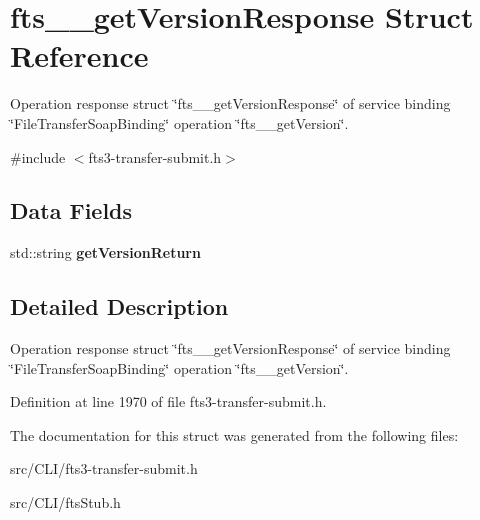 \section{fts\_\-\_\-getVersionResponse Struct Reference}
\label{structfts____getVersionResponse}


Operation response struct \char`\"{}fts\_\-\_\-getVersionResponse\char`\"{} of service binding \char`\"{}FileTransferSoapBinding\char`\"{} operation \char`\"{}fts\_\-\_\-getVersion\char`\"{}.  




{\ttfamily \#include $<$fts3-\/transfer-\/submit.h$>$}

\subsection*{Data Fields}
\begin{DoxyCompactItemize}
\item 
std::string {\bfseries getVersionReturn}\label{structfts____getVersionResponse_aa57e2ffd35d3a996bb2dfeb21d79a2b7}

\end{DoxyCompactItemize}


\subsection{Detailed Description}
Operation response struct \char`\"{}fts\_\-\_\-getVersionResponse\char`\"{} of service binding \char`\"{}FileTransferSoapBinding\char`\"{} operation \char`\"{}fts\_\-\_\-getVersion\char`\"{}. 

Definition at line 1970 of file fts3-\/transfer-\/submit.h.



The documentation for this struct was generated from the following files:\begin{DoxyCompactItemize}
\item 
src/CLI/fts3-\/transfer-\/submit.h\item 
src/CLI/ftsStub.h\end{DoxyCompactItemize}
